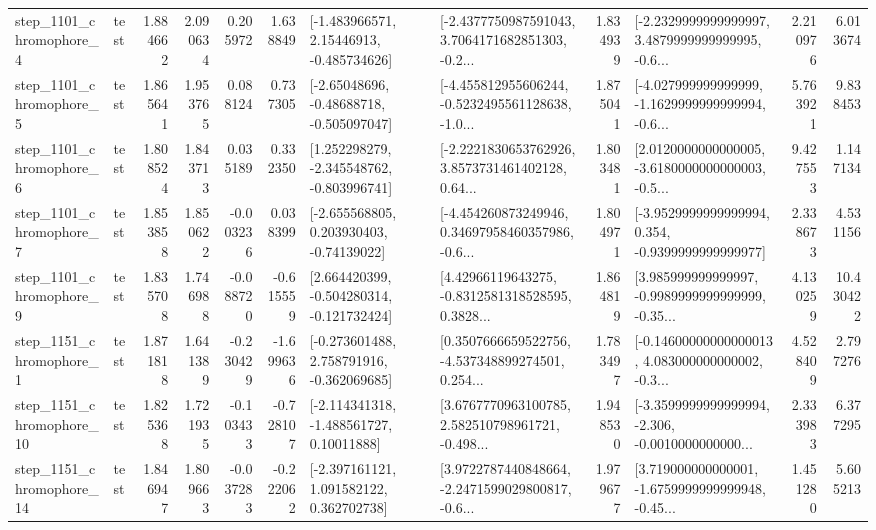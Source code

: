 \begin{tabular}{llrrrrllrlrr}
  step\_1101\_chromophore\_4 &      test &      1.884662 &    2.090634 &      0.205972 &  1.638849 &    [-1.483966571, 2.15446913, -0.485734626] &  [-2.4377750987591043, 3.7064171682851303, -0.2... &       1.834939 &  [-2.2329999999999997, 3.4879999999999995, -0.6... &            2.210976 &          6.013674 \\
  step\_1101\_chromophore\_5 &      test &      1.865641 &    1.953765 &      0.088124 &  0.737305 &    [-2.65048696, -0.48688718, -0.505097047] &  [-4.455812955606244, -0.5232495561128638, -1.0... &       1.875041 &  [-4.027999999999999, -1.1629999999999994, -0.6... &            5.763921 &          9.838453 \\
  step\_1101\_chromophore\_6 &      test &      1.808524 &    1.843713 &      0.035189 &  0.332350 &   [1.252298279, -2.345548762, -0.803996741] &  [-2.2221830653762926, 3.8573731461402128, 0.64... &       1.803481 &  [2.0120000000000005, -3.6180000000000003, -0.5... &            9.427553 &          1.147134 \\
  step\_1101\_chromophore\_7 &      test &      1.853858 &    1.850622 &     -0.003236 &  0.038399 &    [-2.655568805, 0.203930403, -0.74139022] &  [-4.454260873249946, 0.34697958460357986, -0.6... &       1.804971 &  [-3.9529999999999994, 0.354, -0.9399999999999977] &            2.338673 &          4.531156 \\
  step\_1101\_chromophore\_9 &      test &      1.835708 &    1.746988 &     -0.088720 & -0.615559 &   [2.664420399, -0.504280314, -0.121732424] &  [4.42966119643275, -0.8312581318528595, 0.3828... &       1.864819 &  [3.985999999999997, -0.9989999999999999, -0.35... &            4.130259 &         10.430422 \\
  step\_1151\_chromophore\_1 &      test &      1.871818 &    1.641389 &     -0.230429 & -1.699636 &   [-0.273601488, 2.758791916, -0.362069685] &  [0.3507666659522756, -4.537348899274501, 0.254... &       1.783497 &  [-0.14600000000000013, 4.083000000000002, -0.3... &            4.528409 &          2.797276 \\
 step\_1151\_chromophore\_10 &      test &      1.825368 &    1.721935 &     -0.103433 & -0.728107 &    [-2.114341318, -1.488561727, 0.10011888] &  [3.6767770963100785, 2.582510798961721, -0.498... &       1.948530 &  [-3.3599999999999994, -2.306, -0.0010000000000... &            2.333983 &          6.377295 \\
 step\_1151\_chromophore\_14 &      test &      1.846947 &    1.809663 &     -0.037283 & -0.222062 &    [-2.397161121, 1.091582122, 0.362702738] &  [3.9722787440848664, -2.2471599029800817, -0.6... &       1.979677 &  [3.719000000000001, -1.6759999999999948, -0.45... &            1.451280 &          5.605213 \\

\end{tabular}
